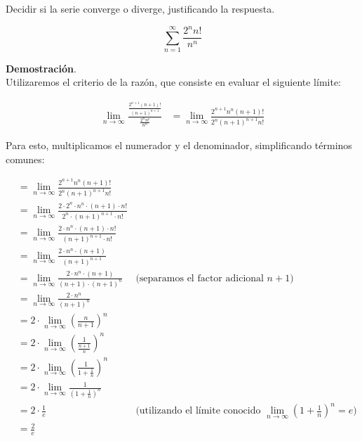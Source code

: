 \documentclass{article}
\begin{document}
    Decidir si la serie converge o diverge, justificando la respuesta.

    $$
    \sum_{n=1}^{\infty} \frac{2^{n} n!}{n^{n}}
    $$

    \textbf{Demostración}.\\

    Utilizaremos el criterio de la razón, que consiste en evaluar el siguiente límite:

    $$
    \begin{aligned}
    \lim _{n \rightarrow \infty} \frac{\frac{2^{n+1}(n+1)!}{(n+1)^{n+1}}}{\frac{2^{n} n!}{n^{n}}} & =\lim _{n \rightarrow \infty} \frac{2^{n+1} n^{n}(n+1)!}{2^{n}(n+1)^{n+1} n!}
    \end{aligned}
    $$

    Para esto, multiplicamos el numerador y el denominador, simplificando términos comunes:

    $$
    \begin{aligned}
    & = \lim _{n \rightarrow \infty} \frac{2^{n+1} n^{n}(n+1)!}{2^{n}(n+1)^{n+1} n!} \\
    & = \lim _{n \rightarrow \infty} \frac{2 \cdot 2^{n} \cdot n^{n} \cdot (n+1) \cdot n!}{2^{n} \cdot (n+1)^{n+1} \cdot n!} \\
    & = \lim _{n \rightarrow \infty} \frac{2 \cdot n^{n} \cdot (n+1) \cdot n!}{(n+1)^{n+1} \cdot n!} \\
    & = \lim _{n \rightarrow \infty} \frac{2 \cdot n^{n} \cdot (n+1)}{(n+1)^{n+1}} \\
    & = \lim _{n \rightarrow \infty} \frac{2 \cdot n^{n} \cdot (n+1)}{(n+1) \cdot (n+1)^n} & \text{(separamos el factor adicional $n+1$)} \\
    & = \lim _{n \rightarrow \infty} \frac{2 \cdot n^{n}}{(n+1)^n} \\
    & = 2 \cdot \lim _{n \rightarrow \infty} \left(\frac{n}{n+1}\right)^{n} \\
    & = 2 \cdot \lim _{n \rightarrow \infty} \left(\frac{1}{\frac{n+1}{n}}\right)^{n} \\
    & = 2 \cdot \lim _{n \rightarrow \infty} \left(\frac{1}{1+\frac{1}{n}}\right)^{n} \\
    & = 2 \cdot \lim _{n \rightarrow \infty} \frac{1}{\left(1+\frac{1}{n}\right)^{n}} \\
    & = 2 \cdot \frac{1}{e} & \text{(utilizando el límite conocido $\lim_{n \rightarrow \infty} \left(1 + \frac{1}{n}\right)^n = e$)} \\
    & = \frac{2}{e}
    \end{aligned}
    $$
\end{document}

